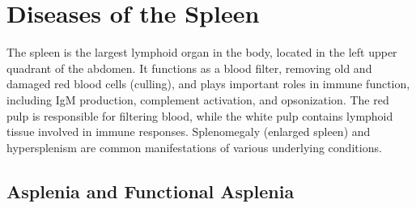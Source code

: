 \chapter{Diseases of the Spleen}
\label{ch:spleen}
The spleen is the largest lymphoid organ in the body, located in the left upper quadrant of the abdomen. It functions as a blood filter, removing old and damaged red blood cells (culling), and plays important roles in immune function, including IgM production, complement activation, and opsonization. The red pulp is responsible for filtering blood, while the white pulp contains lymphoid tissue involved in immune responses. Splenomegaly (enlarged spleen) and hypersplenism are common manifestations of various underlying conditions.

\section{Asplenia and Functional Asplenia}








\label{sec:Asplenia and Functional Asplenia}

